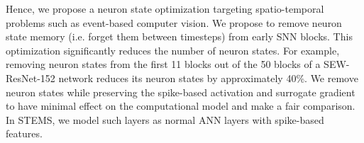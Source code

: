 Hence, we propose a neuron state optimization targeting spatio-temporal problems such as event-based computer vision. We propose to remove neuron state memory (i.e. forget them between timesteps) from early SNN blocks. This optimization significantly reduces the number of neuron states. For example, removing neuron states from the first 11 blocks out of the 50 blocks of a SEW-ResNet-152 \cite{sewresnet} network reduces its neuron states by approximately 40\%. We remove neuron states while preserving the spike-based activation and surrogate gradient to have minimal effect on the computational model and make a fair comparison. In STEMS, we model such layers as normal ANN layers with spike-based features.




